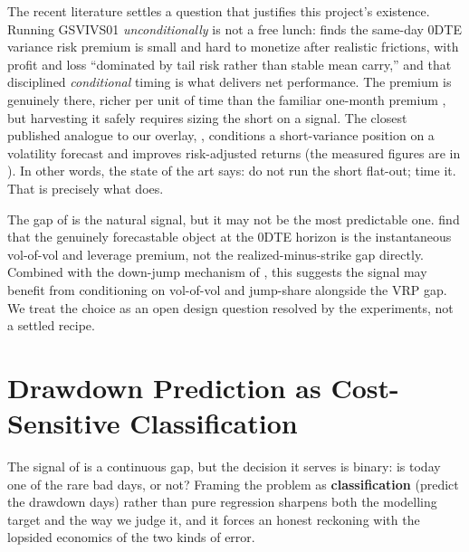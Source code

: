 \begin{application}
The recent literature settles a question that justifies this project's existence. Running GSVIVS01 \emph{unconditionally} is not a free lunch: \citet{Vilkov2024} finds the same-day 0DTE variance risk premium is small and hard to monetize after realistic frictions, with profit and loss ``dominated by tail risk rather than stable mean carry,'' and that disciplined \emph{conditional} timing is what delivers net performance. The premium is genuinely there, richer per unit of time than the familiar one-month premium \citep{AlmeidaFreireHizmeri2024}, but harvesting it safely requires sizing the short on a signal. The closest published analogue to our overlay, \citet{Yang2024}, conditions a short-variance position on a volatility forecast and improves risk-adjusted returns (the measured figures are in ). In other words, the state of the art says: do not run the short flat-out; time it. That is precisely what  does.
\end{application}

\begin{warning}
The gap of  is the natural signal, but it may not be the most predictable one. \citet{BandiFusariReno2024} find that the genuinely forecastable object at the 0DTE horizon is the instantaneous vol-of-vol and leverage premium, not the realized-minus-strike gap directly. Combined with the down-jump mechanism of , this suggests the signal may benefit from conditioning on vol-of-vol and jump-share alongside the VRP gap. We treat the choice as an open design question resolved by the experiments, not a settled recipe.
\end{warning}

\section{Drawdown Prediction as Cost-Sensitive Classification}
\label{sec:gsvivs:classification}

The signal of  is a continuous gap, but the decision it serves is binary: is today one of the rare bad days, or not? Framing the problem as \textbf{classification} (predict the drawdown days) rather than pure regression sharpens both the modelling target and the way we judge it, and it forces an honest reckoning with the lopsided economics of the two kinds of error.

